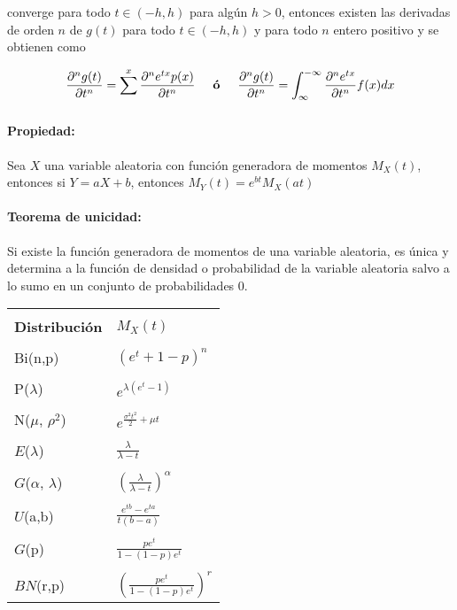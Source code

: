 converge para todo $t\in (-h,h)$ para algún $h > 0$, entonces existen las derivadas de orden $n$ de $g(t)$ para todo $t\in(-h,h)$ y para todo $n$ entero positivo y se obtienen como

\begin{align*}
	\frac{\partial^{n}g(t)}{\partial t^{n}} = \sum_{}^{x} \frac{\partial^{n}e^{tx}p(x)}{\partial t^{n}} \hspace{5mm}\textbf{ó}\hspace{5mm}	\frac{\partial^{n}g(t)}{\partial t^{n}} = \int_{\infty}^{-\infty}\frac{\partial^{n}e^{tx}}{\partial t^{n}}f(x)dx
\end{align*}


\paragraph{Propiedad:} Sea $X$ una variable aleatoria con función generadora de momentos $M_X(t)$, entonces si $Y = aX+b$, entonces $M_Y(t) = e^{bt}M_X(at)$

\paragraph{Teorema de unicidad:} Si existe la función generadora de momentos de una variable aleatoria, es única y determina a la función de densidad o probabilidad de la variable aleatoria salvo a lo sumo en un conjunto de probabilidades $0$.

\vspace*{5mm}
\begin{tabular}{|l|l|}
	\hline &\\
	\textbf{Distribución} & $M_X(t)$ \\
		\hline& \\
	Bi(n,p) & $(e^t + 1-p)^n$\\
		\hline &\\
	P($\lambda$)& $e^{\lambda(e^t-1)}$\\
		\hline &\\
	N($\mu$, $\rho^2$)& $e^{\frac{\sigma^2t^2}{2}+\mu t}$\\
		\hline &\\
	$E$($\lambda$)& $\frac{\lambda}{\lambda-t}$\\
		\hline &\\
	$G$($\alpha$, $\lambda$)& $ \left(\frac{\lambda}{\lambda-t}\right)^\alpha$\\
		\hline &\\
	$U$(a,b) & $ \frac{e^{tb} - e^{ta}}{t(b-a)}$\\
		\hline &\\
	$G$(p) & $\frac{pe^t}{1-(1-p)e^t}$\\
		\hline &\\
	$BN$(r,p) & $\left(\frac{pe^t}{1-(1-p)e^t}\right)^r$\\
		\hline
\end{tabular}


